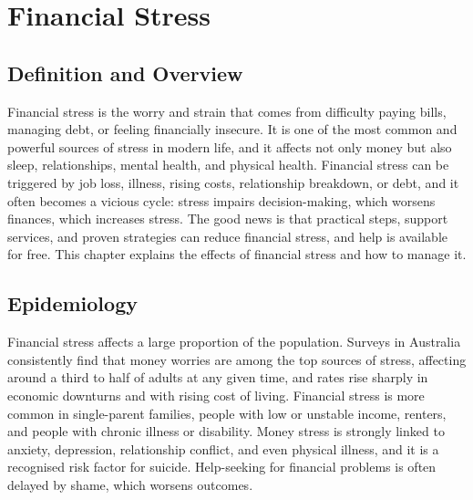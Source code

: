 \chapter{Financial Stress}

\section*{Definition and Overview}
Financial stress is the worry and strain that comes from difficulty paying bills, managing debt, or feeling financially insecure. It is one of the most common and powerful sources of stress in modern life, and it affects not only money but also sleep, relationships, mental health, and physical health. Financial stress can be triggered by job loss, illness, rising costs, relationship breakdown, or debt, and it often becomes a vicious cycle: stress impairs decision-making, which worsens finances, which increases stress. The good news is that practical steps, support services, and proven strategies can reduce financial stress, and help is available for free. This chapter explains the effects of financial stress and how to manage it.

\section*{Epidemiology}
Financial stress affects a large proportion of the population. Surveys in Australia consistently find that money worries are among the top sources of stress, affecting around a third to half of adults at any given time, and rates rise sharply in economic downturns and with rising cost of living. Financial stress is more common in single-parent families, people with low or unstable income, renters, and people with chronic illness or disability. Money stress is strongly linked to anxiety, depression, relationship conflict, and even physical illness, and it is a recognised risk factor for suicide. Help-seeking for financial problems is often delayed by shame, which worsens outcomes.

